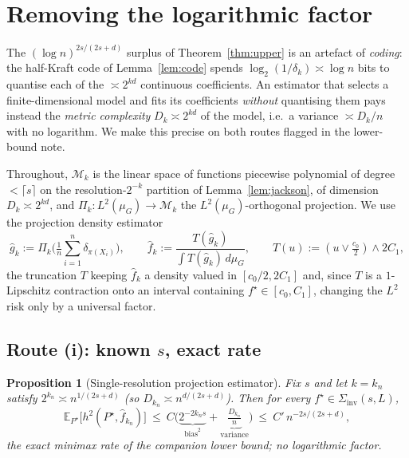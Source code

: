 \documentclass[11pt]{article}
\theoremstyle{plain}
\newtheorem{proposition}[theorem]{Proposition}
\theoremstyle{definition}
\theoremstyle{remark}
\newcommand{\E}{\mathbb{E}}
\begin{document}
\section{Removing the logarithmic factor}\label{sec:nolog}

The $(\log n)^{2s/(2s+d)}$ surplus of Theorem~\ref{thm:upper} is an artefact of
\emph{coding}: the half-Kraft code of Lemma~\ref{lem:code} spends
$\log_2(1/\delta_k)\asymp\log n$ bits to quantise each of the $\asymp2^{kd}$
continuous coefficients. An estimator that selects a finite-dimensional model and
fits its coefficients \emph{without} quantising them pays instead the
\emph{metric complexity} $D_k\asymp2^{kd}$ of the model, i.e.\ a variance
$\asymp D_k/n$ with no logarithm. We make this precise on both routes flagged in
the lower-bound note.

Throughout, $\mathcal M_k$ is the linear space of functions piecewise polynomial
of degree $<\lceil s\rceil$ on the resolution-$2^{-k}$ partition of
Lemma~\ref{lem:jackson}, of dimension $D_k\asymp2^{kd}$, and
$\Pi_k:L^2(\mu_G)\to\mathcal M_k$ the $L^2(\mu_G)$-orthogonal projection. We use
the projection density estimator
\[
\widehat g_k:=\Pi_k\Big(\tfrac1n\sum_{i=1}^n\delta_{\pi(X_i)}\Big),\qquad
\widehat f_k:=\frac{T(\widehat g_k)}{\int T(\widehat g_k)\,d\mu_G},\qquad
T(u):=(u\vee\tfrac{c_0}{2})\wedge2C_1 ,
\]
the truncation $T$ keeping $\widehat f_k$ a density valued in $[c_0/2,2C_1]$ and,
since $T$ is a $1$-Lipschitz contraction onto an interval containing
$f^\star\in[c_0,C_1]$, changing the $L^2$ risk only by a universal factor.

\subsection{Route (i): known $s$, exact rate}

\begin{proposition}[Single-resolution projection estimator]\label{prop:knowns}
Fix $s$ and let $k=k_n$ satisfy $2^{k_n}\asymp n^{1/(2s+d)}$ (so $D_{k_n}\asymp
n^{d/(2s+d)}$). Then for every $f^\star\in\Sigma_{\mathrm{inv}}(s,L)$,
\[
\E_{P^\star}\big[h^2(P^\star,\widehat f_{k_n})\big]
\ \le\ C\Big(\underbrace{2^{-2k_n s}}_{\mathrm{bias}^2}+\underbrace{\tfrac{D_{k_n}}{n}}_{\mathrm{variance}}\Big)
\ \le\ C'\,n^{-2s/(2s+d)},
\]
the exact minimax rate of the companion lower bound; no logarithmic factor.
\end{proposition}
\end{document}
